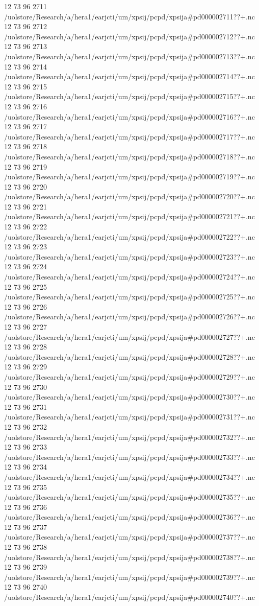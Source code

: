 12 73 96
2711
/uolstore/Research/a/hera1/earjcti/um/xpsij/pcpd/xpsija#pd000002711??+.nc
12 73 96
2712
/uolstore/Research/a/hera1/earjcti/um/xpsij/pcpd/xpsija#pd000002712??+.nc
12 73 96
2713
/uolstore/Research/a/hera1/earjcti/um/xpsij/pcpd/xpsija#pd000002713??+.nc
12 73 96
2714
/uolstore/Research/a/hera1/earjcti/um/xpsij/pcpd/xpsija#pd000002714??+.nc
12 73 96
2715
/uolstore/Research/a/hera1/earjcti/um/xpsij/pcpd/xpsija#pd000002715??+.nc
12 73 96
2716
/uolstore/Research/a/hera1/earjcti/um/xpsij/pcpd/xpsija#pd000002716??+.nc
12 73 96
2717
/uolstore/Research/a/hera1/earjcti/um/xpsij/pcpd/xpsija#pd000002717??+.nc
12 73 96
2718
/uolstore/Research/a/hera1/earjcti/um/xpsij/pcpd/xpsija#pd000002718??+.nc
12 73 96
2719
/uolstore/Research/a/hera1/earjcti/um/xpsij/pcpd/xpsija#pd000002719??+.nc
12 73 96
2720
/uolstore/Research/a/hera1/earjcti/um/xpsij/pcpd/xpsija#pd000002720??+.nc
12 73 96
2721
/uolstore/Research/a/hera1/earjcti/um/xpsij/pcpd/xpsija#pd000002721??+.nc
12 73 96
2722
/uolstore/Research/a/hera1/earjcti/um/xpsij/pcpd/xpsija#pd000002722??+.nc
12 73 96
2723
/uolstore/Research/a/hera1/earjcti/um/xpsij/pcpd/xpsija#pd000002723??+.nc
12 73 96
2724
/uolstore/Research/a/hera1/earjcti/um/xpsij/pcpd/xpsija#pd000002724??+.nc
12 73 96
2725
/uolstore/Research/a/hera1/earjcti/um/xpsij/pcpd/xpsija#pd000002725??+.nc
12 73 96
2726
/uolstore/Research/a/hera1/earjcti/um/xpsij/pcpd/xpsija#pd000002726??+.nc
12 73 96
2727
/uolstore/Research/a/hera1/earjcti/um/xpsij/pcpd/xpsija#pd000002727??+.nc
12 73 96
2728
/uolstore/Research/a/hera1/earjcti/um/xpsij/pcpd/xpsija#pd000002728??+.nc
12 73 96
2729
/uolstore/Research/a/hera1/earjcti/um/xpsij/pcpd/xpsija#pd000002729??+.nc
12 73 96
2730
/uolstore/Research/a/hera1/earjcti/um/xpsij/pcpd/xpsija#pd000002730??+.nc
12 73 96
2731
/uolstore/Research/a/hera1/earjcti/um/xpsij/pcpd/xpsija#pd000002731??+.nc
12 73 96
2732
/uolstore/Research/a/hera1/earjcti/um/xpsij/pcpd/xpsija#pd000002732??+.nc
12 73 96
2733
/uolstore/Research/a/hera1/earjcti/um/xpsij/pcpd/xpsija#pd000002733??+.nc
12 73 96
2734
/uolstore/Research/a/hera1/earjcti/um/xpsij/pcpd/xpsija#pd000002734??+.nc
12 73 96
2735
/uolstore/Research/a/hera1/earjcti/um/xpsij/pcpd/xpsija#pd000002735??+.nc
12 73 96
2736
/uolstore/Research/a/hera1/earjcti/um/xpsij/pcpd/xpsija#pd000002736??+.nc
12 73 96
2737
/uolstore/Research/a/hera1/earjcti/um/xpsij/pcpd/xpsija#pd000002737??+.nc
12 73 96
2738
/uolstore/Research/a/hera1/earjcti/um/xpsij/pcpd/xpsija#pd000002738??+.nc
12 73 96
2739
/uolstore/Research/a/hera1/earjcti/um/xpsij/pcpd/xpsija#pd000002739??+.nc
12 73 96
2740
/uolstore/Research/a/hera1/earjcti/um/xpsij/pcpd/xpsija#pd000002740??+.nc
